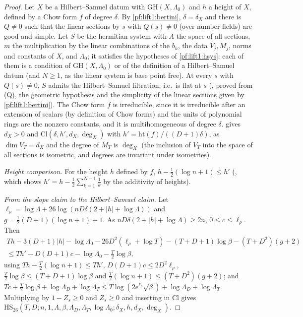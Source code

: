 \begin{proof}
Let $X$ be a Hilbert--Samuel datum with $\mathrm{GH}(X,\Lambda_0)$ and $h$ a height of $X$, defined by a Chow
form $f$ of degree $\delta$. By \cref{pf:lift1:bertini}, $\delta=\delta_X$ and there is $Q\ne0$ such that the
linear sections by $s$ with $Q(s)\ne0$ (over number fields) are good and simple. Let $S$ be the hermitian
system with $A$ the space of all sections, $m$ the multiplication by the linear combinations of the
$b_k$, the data $V_j,M_j$, norms and constants of $X$, and $\Lambda_0$; it satisfies the hypotheses of
\cref{pf:lift1:hsys}: each of them is a condition of $\mathrm{GH}(X,\Lambda_0)$ or of the definition of a
Hilbert--Samuel datum (and $N\ge1$, as the linear system is base point free). At every $s$ with $Q(s)\ne0$, $S$ admits the
Hilbert--Samuel filtration, i.e.\ is flat at $s$
(, proved from (Q), the geometric hypothesis
and the simplicity of the linear sections given by \cref{pf:lift1:bertini}). The Chow form $f$ is irreducible, since it is
irreducible after an extension of scalars (by definition of Chow forms) and the units of polynomial rings
are the nonzero constants, and it is multihomogeneous of degree $\delta$.
 gives $d_X>0$ and $\mathrm{Cl}(\delta,h',d_X,\deg_X)$ with
$h'=\mathrm{ht}(f)/((D+1)\delta)$, as $\dim V_T=d_X$ and the degree of $M_T$ is $\deg_X$ (the
inclusion of $V_T$ into the space of all sections is isometric, and degrees are invariant under isometries).

\emph{Height comparison.} For the height $h$ defined by $f$, $h-\frac12(\log n+1)\le h'$
(, which shows
$h'=h-\frac12\sum_{k=1}^{N-1}\frac1k$ by the additivity of heights).

\emph{From the slope claim to the Hilbert--Samuel claim.} Let $\ell_\rho=\log\Lambda+26\log(nD\delta(2+|h|+\log\Lambda))$ and
$g=\frac12(D+1)(\log n+1)+1$. As $nD\delta(2+|h|+\log\Lambda)\ge2n$, $0\le c\le\ell_\rho$. Then
\begin{multline*}
Th-3(D+1)|h|-\log\Lambda_0-26D^2(\ell_\rho+\log T)-(T+D+1)\log\beta-(T+D^2)(g+2)\\
\le Th'-D(D+1)c-\log\Lambda_0-\tfrac T2\log\beta,
\end{multline*}
using $Th-\frac T2(\log n+1)\le Th'$, $D(D+1)c\le2D^2\ell_\rho$, $\frac T2\log\beta\le(T+D+1)\log\beta$
and $\frac T2(\log n+1)\le(T+D^2)(g+2)$; and
$Tc+\frac T2\log\beta+\log\Lambda_D+\log\Lambda_T\le T\log(2e^{\ell_\rho}\sqrt\beta)+\log\Lambda_D+\log\Lambda_T$.
Multiplying by $1-Z_s\ge0$ and $Z_s\ge0$ and inserting in $\mathrm{Cl}$ gives
$\mathrm{HS}_{26}(T,D;n,1,\Lambda,\beta,\Lambda_D,\Lambda_T,\log\Lambda_0;\delta_X,h,d_X,\deg_X)$.
\end{proof}

